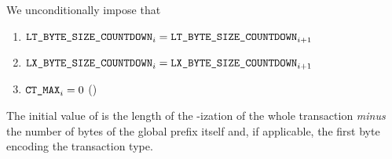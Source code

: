 \begin{center}
\end{center}

We unconditionally impose that
\begin{enumerate}
	\item $\texttt{LT\_BYTE\_SIZE\_COUNTDOWN} _{i} = \texttt{LT\_BYTE\_SIZE\_COUNTDOWN} _{i + 1}$
	\item $\texttt{LX\_BYTE\_SIZE\_COUNTDOWN} _{i} = \texttt{LX\_BYTE\_SIZE\_COUNTDOWN} _{i + 1}$
	\item $\texttt{CT\_MAX}    _{i} = 0$  \quad (\sanityCheck)
\end{enumerate}
\saNote{}
The initial value of \ltByteSizeCountdown{}
is the length of the \rlp{}-ization of the whole transaction \emph{minus}
the number of bytes of the global \rlp{} prefix itself and,
if applicable, the first byte encoding the transaction type.

